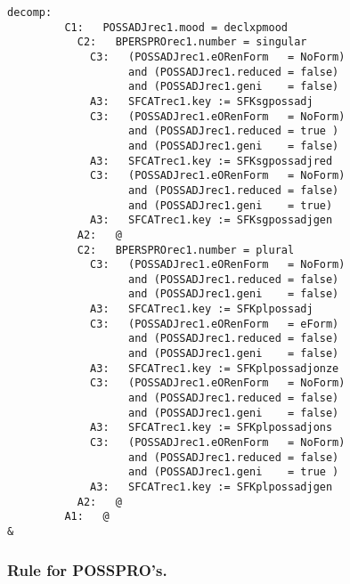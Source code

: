 \begin{verbatim}
decomp:  
         C1:   POSSADJrec1.mood = declxpmood
           C2:   BPERSPROrec1.number = singular
             C3:   (POSSADJrec1.eORenForm   = NoForm) 
                   and (POSSADJrec1.reduced = false) 
                   and (POSSADJrec1.geni    = false) 
             A3:   SFCATrec1.key := SFKsgpossadj
             C3:   (POSSADJrec1.eORenForm   = NoForm) 
                   and (POSSADJrec1.reduced = true ) 
                   and (POSSADJrec1.geni    = false) 
             A3:   SFCATrec1.key := SFKsgpossadjred
             C3:   (POSSADJrec1.eORenForm   = NoForm) 
                   and (POSSADJrec1.reduced = false) 
                   and (POSSADJrec1.geni    = true) 
             A3:   SFCATrec1.key := SFKsgpossadjgen
           A2:   @
           C2:   BPERSPROrec1.number = plural
             C3:   (POSSADJrec1.eORenForm   = NoForm) 
                   and (POSSADJrec1.reduced = false) 
                   and (POSSADJrec1.geni    = false) 
             A3:   SFCATrec1.key := SFKplpossadj
             C3:   (POSSADJrec1.eORenForm   = eForm) 
                   and (POSSADJrec1.reduced = false) 
                   and (POSSADJrec1.geni    = false) 
             A3:   SFCATrec1.key := SFKplpossadjonze
             C3:   (POSSADJrec1.eORenForm   = NoForm) 
                   and (POSSADJrec1.reduced = false) 
                   and (POSSADJrec1.geni    = false) 
             A3:   SFCATrec1.key := SFKplpossadjons
             C3:   (POSSADJrec1.eORenForm   = NoForm) 
                   and (POSSADJrec1.reduced = false) 
                   and (POSSADJrec1.geni    = true ) 
             A3:   SFCATrec1.key := SFKplpossadjgen
           A2:   @
         A1:   @
&
\end{verbatim}
\newpage
\subsubsection{Rule for POSSPRO's.}

